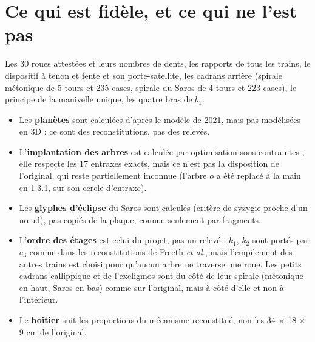 \documentclass[a4paper,11pt]{article}
\begin{document}
\section{Ce qui est fidèle, et ce qui ne l'est pas}

\begin{astuce}
Les 30 roues attestées et leurs nombres de dents, les rapports de tous les
trains, le dispositif à tenon et fente et son porte-satellite, les cadrans
arrière (spirale métonique de 5 tours et 235 cases, spirale du Saros de 4 tours
et 223 cases), le principe de la manivelle unique, les quatre bras de $b_1$.
\end{astuce}

\begin{attention}
\begin{itemize}[leftmargin=6mm]
  \item Les \textbf{planètes} sont calculées d'après le modèle de 2021, mais
        pas modélisées en 3D : ce sont des reconstitutions, pas des relevés.
  \item L'\textbf{implantation des arbres} est calculée par optimisation sous
        contraintes ; elle respecte les 17 entraxes exacts, mais ce n'est pas
        la disposition de l'original, qui reste partiellement inconnue (l'arbre
        $o$ a été replacé à la main en 1.3.1, sur son cercle d'entraxe).
  \item Les \textbf{glyphes d'éclipse} du Saros sont calculés (critère de
        syzygie proche d'un n\oe ud), pas copiés de la plaque, connue
        seulement par fragments.
  \item L'\textbf{ordre des étages} est celui du projet, pas un relevé :
        $k_1$, $k_2$ sont portés par $e_3$ comme dans les reconstitutions
        de Freeth \textit{et al.}, mais l'empilement des autres trains est
        choisi pour qu'aucun arbre ne traverse une roue. Les petits cadrans
        callippique et de l'exeligmos sont du côté de leur spirale (métonique
        en haut, Saros en bas) comme sur l'original, mais à côté d'elle et non
        à l'intérieur.
  \item Le \textbf{boîtier} suit les proportions du mécanisme reconstitué, non
        les 34 $\times$ 18 $\times$ 9 cm de l'original.
\end{itemize}
\end{attention}

\newpage
\end{document}
